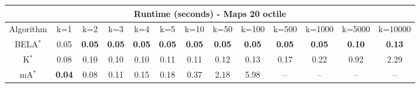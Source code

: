 \begin{tabular}{c|cccccccccccc}\toprule
\multicolumn{13}{c}{Runtime (seconds) - Maps 20 octile}\\ \midrule
Algorithm & k=1 & k=2 & k=3 & k=4 & k=5 & k=10 & k=50 & k=100 & k=500 & k=1000 & k=5000 & k=10000 \\ \midrule
BELA$^*$ & 0.05 & \textbf{0.05} & \textbf{0.05} & \textbf{0.05} & \textbf{0.05} & \textbf{0.05} & \textbf{0.05} & \textbf{0.05} & \textbf{0.05} & \textbf{0.05} & \textbf{0.10} & \textbf{0.13} \\
K$^*$ & 0.08 & 0.10 & 0.10 & 0.10 & 0.11 & 0.11 & 0.12 & 0.13 & 0.17 & 0.22 & 0.92 & 2.29 \\
mA$^*$ & \textbf{0.04} & 0.08 & 0.11 & 0.15 & 0.18 & 0.37 & 2.18 & 5.98 & -- & -- & -- & -- \\ \bottomrule 
\end{tabular}
